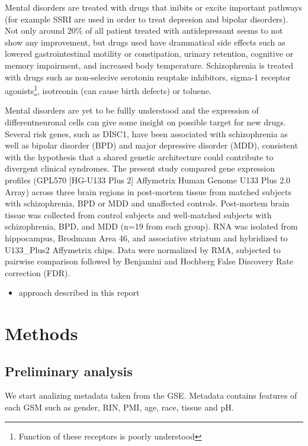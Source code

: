 \documentclass[11pt, onecolumn, twoside]{article}
\begin{document}
Mental disorders are treated with drugs that inibits or excite important pathways (for example SSRI are used in order to treat depresion and bipolar disorders).
Not only around 20\% of all patient treated with antidepressant seems to not show any improvement, but drugs used have drammatical side effects such as lowered gastrointestinal motility or constipation, urinary retention, cognitive or memory impairment, and increased body temperature.
Schizophrenia is treated with drugs such as non-selecive serotonin reuptake inhibitors, sigma-1 receptor agonists\footnote{Function of these receptors is poorly understood}, isotreonin (can cause birth defects) or toluene.

Mental disorders are yet to be fullly understood and the expression of differentneuronal cells can give some insight on possible target for new drugs.
Several risk genes, such as DISC1, have been associated with schizophrenia as well as bipolar disorder (BPD) and major depressive disorder (MDD), consistent with the hypothesis that a shared genetic architecture could contribute to divergent clinical syndromes.
The present study compared gene expression profiles (GPL570 {[}HG-U133 Plus 2{]} Affymetrix Human Genome U133 Plus 2.0 Array) across three brain regions in post-mortem tissue from matched subjects with schizophrenia, BPD or MDD and unaffected controls.
Post-mortem brain tissue was collected from control subjects and well-matched subjects with schizophrenia, BPD, and MDD (n=19 from each group).
RNA was isolated from hippocampus, Brodmann Area 46, and associative striatum and hybridized to U133\_Plus2 Affymetrix chips.
Data were normalized by RMA, subjected to pairwise comparison followed by Benjamini and Hochberg False Discovery Rate correction (FDR).

\begin{itemize}
\item approach described in this report
\end{itemize}

\section{Methods}\label{methods}


\subsection{Preliminary analysis}
We start analizing metadata taken from the GSE.
Metadata contains features of each GSM such as gender, RIN, PMI, age, race, tissue and pH.
\end{document}
